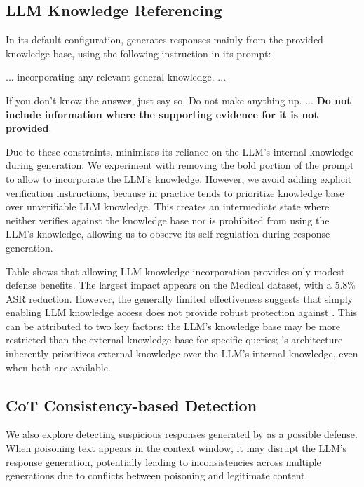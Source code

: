 \subsection{LLM Knowledge Referencing}


In its default configuration, \rag generates responses mainly from the provided knowledge base, using the following instruction in its prompt:
\begin{mtbox}{} 
... incorporating any relevant general knowledge. ...

If you don't know the answer, just say so. Do not make anything up. ...
\textbf{Do not include information where the supporting evidence for it is not provided}.
\end{mtbox}
Due to these constraints, \rag minimizes its reliance on the LLM's internal knowledge during generation. We experiment with removing the bold portion of the prompt to allow \rag to incorporate the LLM's knowledge. However, we avoid adding explicit verification instructions, because in practice \rag tends to prioritize knowledge base over unverifiable LLM knowledge. This creates an intermediate state where \rag neither verifies against the knowledge base nor is prohibited from using the LLM's knowledge, allowing us to observe its self-regulation during response generation. 

Table shows that allowing LLM knowledge incorporation provides only modest defense benefits. The largest impact appears on the Medical dataset, with a 5.8\% ASR reduction. However, the generally limited effectiveness suggests that simply enabling LLM knowledge access does not provide robust protection against \attack. This can be attributed to two key factors: the LLM's knowledge base may be more restricted than the external knowledge base for specific queries; \rag's architecture inherently prioritizes external knowledge over the LLM's internal knowledge, even when both are available.



\subsection{CoT Consistency-based Detection}
We also explore detecting suspicious responses generated by \rag as a possible defense. When poisoning text appears in the context window, it may disrupt the LLM's response generation, potentially leading to inconsistencies across multiple generations due to conflicts between poisoning and legitimate content.

